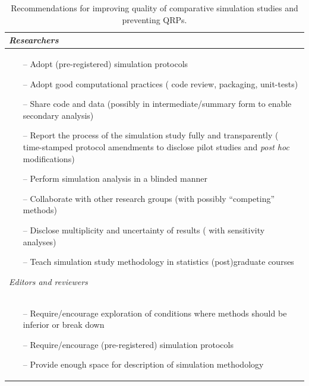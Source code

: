 \documentclass[a4paper, 11pt]{article}
\begin{document}
\begin{table}[!htb]
  \caption{Recommendations for improving quality of comparative simulation studies
    and preventing QRPs.}
  \label{table:recommendations}
  \centering
	\begin{tabular}{p{}}
		\toprule
    \textit{Researchers} \\
    \midrule
    \vspace{-1.5em}
    \begin{itemize}
    \setlength\itemsep{0pt}
    \setlength\itemindent{-12pt}
        \item[--] Adopt (pre-registered) simulation protocols
    \item[--] Adopt good computational practices (\eg{} code review, packaging, unit-tests)
    \item[--] Share code and data (possibly in intermediate/summary form to enable 
    secondary analysis)
    \item[--] Report the process of the simulation study fully and transparently
    (\eg{} time-stamped protocol amendments to disclose pilot studies
    and \emph{post hoc} modifications)
    \item[--] Perform simulation analysis in a blinded manner
    \item[--] Collaborate with other research groups (with possibly
    ``competing'' methods)
    \item[--] Disclose multiplicity and uncertainty of results 
    (\eg{} with sensitivity analyses)
    \item[--] Teach simulation study methodology in statistics (post)graduate courses
    \end{itemize}
    
    \textit{Editors and reviewers} \\
    \midrule
    \vspace{-1.5em}
    \begin{itemize}
    \setlength\itemsep{0pt}
    \setlength\itemindent{-12pt}
    \item[--] Require/encourage exploration of conditions where methods should 
    be inferior or break down
    \item[--] Require/encourage (pre-registered) simulation protocols
    \item[--] Provide enough space for description of simulation methodology
    \end{itemize}


\end{tabular}
\end{table}
\end{document}
